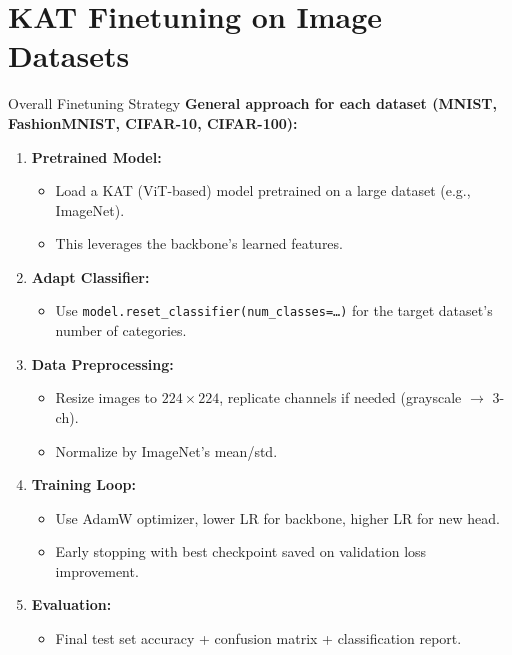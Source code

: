 \documentclass{beamer}
\begin{document}
\section{KAT Finetuning on Image Datasets}
\begin{frame}{Overall Finetuning Strategy}
    \textbf{General approach for each dataset (MNIST, FashionMNIST, CIFAR-10, CIFAR-100):}
    \begin{enumerate}
        \item \textbf{Pretrained Model:}
              \begin{itemize}
                  \item Load a KAT (ViT-based) model pretrained on a large dataset (e.g., ImageNet).
                  \item This leverages the backbone's learned features.
              \end{itemize}
        \item \textbf{Adapt Classifier:}
              \begin{itemize}
                  \item Use \texttt{model.reset\_classifier(num\_classes=\ldots)} for the target dataset's number of categories.
              \end{itemize}
        \item \textbf{Data Preprocessing:}
              \begin{itemize}
                  \item Resize images to $224\times 224$, replicate channels if needed (grayscale $\to$ 3-ch).
                  \item Normalize by ImageNet's mean/std.
              \end{itemize}
        \item \textbf{Training Loop:}
              \begin{itemize}
                  \item Use AdamW optimizer, lower LR for backbone, higher LR for new head.
                  \item Early stopping with best checkpoint saved on validation loss improvement.
              \end{itemize}
        \item \textbf{Evaluation:}
              \begin{itemize}
                  \item Final test set accuracy + confusion matrix + classification report.
              \end{itemize}
    \end{enumerate}
\end{frame}
\end{document}
